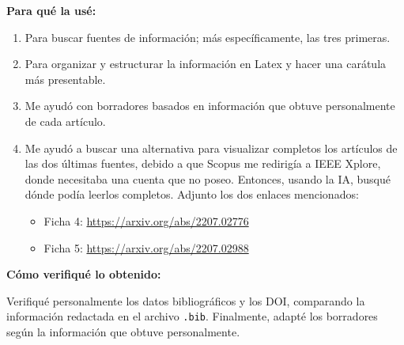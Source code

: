 \documentclass[12pt]{article}
\begin{document}
\textbf{Para qué la usé:}
\begin{enumerate}
    \item Para buscar fuentes de información; más específicamente, las tres primeras.
    \item Para organizar y estructurar la información en Latex y hacer una carátula más presentable.
    \item Me ayudó con borradores basados en información que obtuve personalmente de cada artículo.
    \item Me ayudó a buscar una alternativa para visualizar completos los artículos de las dos últimas fuentes, debido a que Scopus me redirigía a IEEE Xplore, donde necesitaba una cuenta que no poseo. Entonces, usando la IA, busqué dónde podía leerlos completos. Adjunto los dos enlaces mencionados:
    \begin{itemize}
        \item Ficha 4: \url{https://arxiv.org/abs/2207.02776}
        \item Ficha 5: \url{https://arxiv.org/abs/2207.02988}
    \end{itemize}
\end{enumerate}

\textbf{Cómo verifiqué lo obtenido:}

Verifiqué personalmente los datos bibliográficos y los DOI, comparando la información redactada en el archivo \texttt{.bib}. Finalmente, adapté los borradores según la información que obtuve personalmente.
\end{document}

